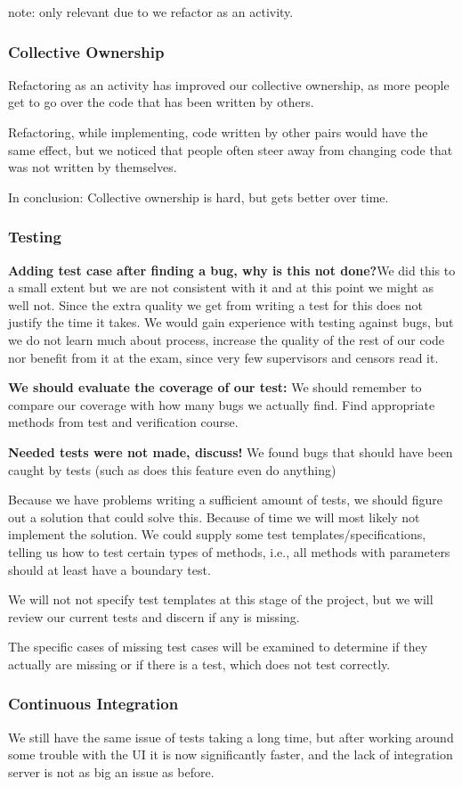 note: only relevant due to we refactor as an activity.

\subsubsection{Collective Ownership}
Refactoring as an activity has improved our collective ownership, as more people get to go over the code that has been written by others.

Refactoring, while implementing, code written by other pairs would have the same effect, but we noticed that people often steer away from changing code that was not written by themselves.

In conclusion: Collective ownership is hard, but gets better over time.

\subsubsection{Testing}
\textbf{Adding test case after finding a bug, why is this not done?}We did this to a small extent but we are not consistent with it and at this point we might as well not. Since the extra quality we get from writing a test for this does not justify the time it takes. We would gain experience with testing against bugs, but we do not learn much about process, increase the quality of the rest of our code nor benefit from it at the exam, since very few supervisors and censors read it.

\textbf{We should evaluate the coverage of our test:}
We should remember to compare our coverage with how many bugs we actually find.
Find appropriate methods from test and verification course.

\textbf{Needed tests were not made, discuss!}
We found bugs that should have been caught by tests (such as does this feature even do anything) 

Because we have problems writing a sufficient amount of tests, we should figure out a solution that could solve this. Because of time we will most likely not implement the solution. We could supply some test templates/specifications, telling us how to test certain types of methods, i.e., all methods with parameters should at least have a boundary test.

We will not not specify test templates at this stage of the project, but we will review our current tests and discern if any is missing.

The specific cases of missing test cases will be examined to determine if they actually are missing or if there is a test, which does not test correctly.


\subsubsection{Continuous Integration}
We still have the same issue of tests taking a long time, but after working around some trouble with the UI it is now significantly faster, and the lack of integration server is not as big an issue as before.